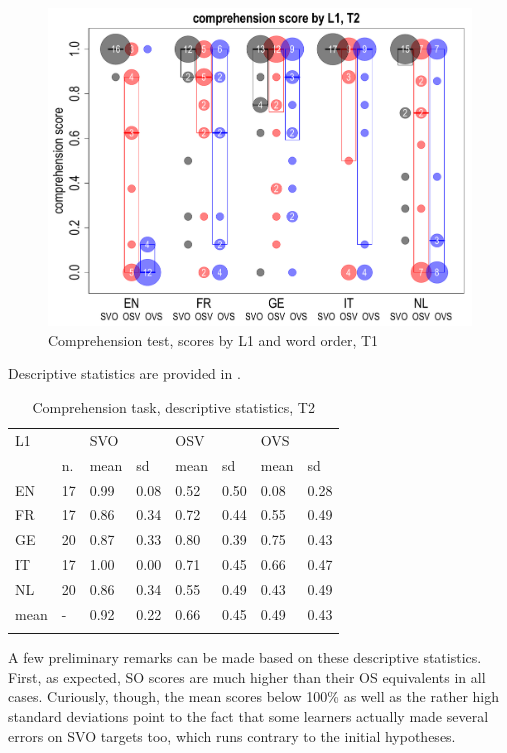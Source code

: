 \begin{figure}
    \includegraphics[width=\textwidth]{figures/05-2.pdf}
    \caption{Comprehension test, scores by L1 and word order, T1}
    \label{fig:05:2}
\end{figure}

Descriptive statistics are provided in .

\begin{table}
    \begin{tabularx}{\textwidth}{XXXXXXXX}
    \lsptoprule
    L1 &  & \multicolumn{2}{X}{SVO} & \multicolumn{2}{X}{OSV} & \multicolumn{2}{X}{OVS}\\
    & n. & mean & sd & mean & sd & mean & sd\\
    \cmidrule{2-8}
    EN & 17 & 0.99 & 0.08 & 0.52 & 0.50 & 0.08 & 0.28\\
    FR & 17 & 0.86 & 0.34 & 0.72 & 0.44 & 0.55 & 0.49\\
    GE & 20 & 0.87 & 0.33 & 0.80 & 0.39 & 0.75 & 0.43\\
    IT & 17 & 1.00 & 0.00 & 0.71 & 0.45 & 0.66 & 0.47\\
    NL & 20 & 0.86 & 0.34 & 0.55 & 0.49 & 0.43 & 0.49\\
    mean & {}- & 0.92 & 0.22 & 0.66 & 0.45 & 0.49 & 0.43\\
    \lspbottomrule
    \end{tabularx}
    \caption{Comprehension task, descriptive statistics, T2}
    \label{tab:05:2}
\end{table}

A few preliminary remarks can be made based on these descriptive statistics. First, as expected, SO scores are much higher than their OS equivalents in all cases. Curiously, though, the mean scores below 100\% as well as the rather high standard deviations point to the fact that some learners actually made several errors on SVO targets too, which runs contrary to the initial hypotheses. 


